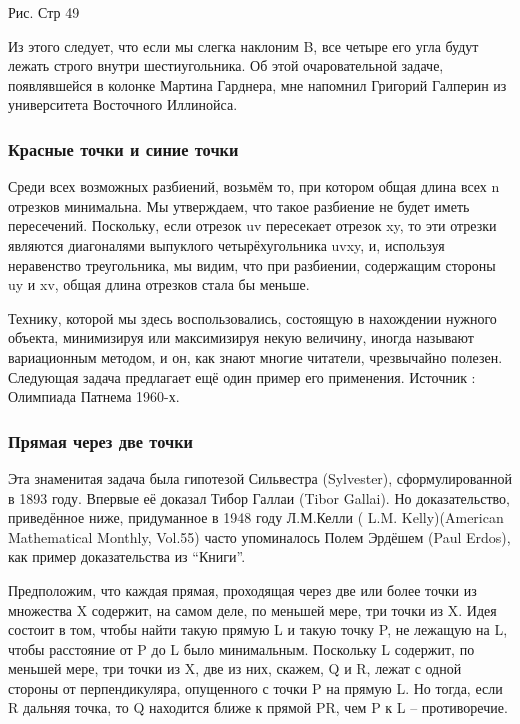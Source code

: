 Рис. Стр 49

Из этого следует, что если мы слегка наклоним B, все четыре его угла будут лежать строго внутри шестиугольника.
Об этой очаровательной задаче, появлявшейся в колонке Мартина Гарднера, мне напомнил Григорий Галперин из университета Восточного Иллинойса.

\subsubsection*{Красные точки и синие точки}%

Среди всех возможных разбиений, возьмём то, при котором общая длина всех n отрезков минимальна.
Мы утверждаем, что такое разбиение не будет иметь пересечений.
Поскольку, если отрезок uv пересекает отрезок xy, то эти отрезки являются диагоналями выпуклого четырёхугольника uvxy, и, используя неравенство треугольника, мы видим, что при разбиении, содержащим стороны uy и xv, общая длина отрезков стала бы меньше.

Технику, которой мы здесь воспользовались, состоящую в нахождении нужного объекта, минимизируя или максимизируя некую величину, иногда называют вариационным методом, и он, как знают многие читатели, чрезвычайно полезен.
Следующая задача предлагает ещё один пример его применения.
Источник : Олимпиада Патнема 1960-х.

\subsubsection*{Прямая через две точки}%

Эта знаменитая задача была гипотезой Сильвестра (Sylvester), сформулированной в 1893 году.
Впервые её доказал Тибор Галлаи (Tibor Gallai).
Но доказательство, приведённое ниже, придуманное в 1948 году Л.М.Келли ( L.M. Kelly)(American Mathematical Monthly, Vol.55) часто упоминалось Полем Эрдёшем (Paul Erdos), как пример доказательства из “Книги”.

Предположим, что каждая прямая, проходящая через две или более точки из множества X содержит, на самом деле, по меньшей мере, три точки из X.
Идея состоит в том, чтобы найти такую прямую L и такую точку P, не лежащую на L, чтобы расстояние от P до L было минимальным.
Поскольку L содержит, по меньшей мере, три точки из X, две из них, скажем, Q и R, лежат с одной стороны от перпендикуляра, опущенного с точки P на прямую L.
Но тогда,
если R дальняя точка, то Q находится ближе к прямой PR, чем P к L -- противоречие.

